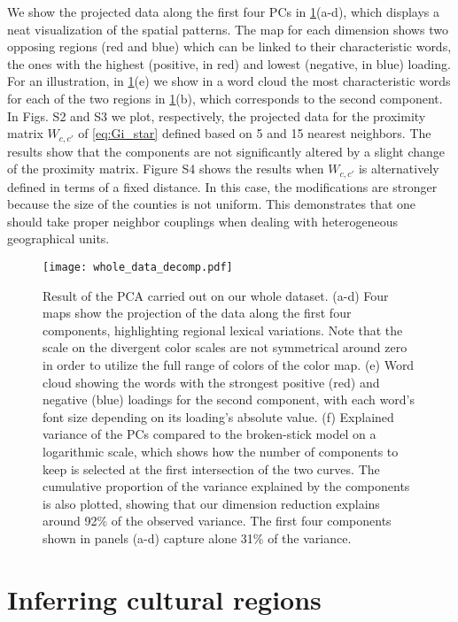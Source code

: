 \documentclass[../thesis.tex]{subfiles}
\begin{document}
We show the projected data along the first four \acp{PC} in
\cref{fig:whole_data_decomp}(a-d), which displays a neat visualization of the spatial
patterns. The map for each dimension shows two opposing regions (red and blue) which can
be linked to their characteristic words, the ones with the highest (positive, in red)
and lowest (negative, in blue) loading. For an illustration, in
\cref{fig:whole_data_decomp}(e) we show in a word cloud the most characteristic words
for each of the two regions in \cref{fig:whole_data_decomp}(b), which corresponds to the
second component. In Figs. S2 and S3 we plot, respectively, the projected data for the
proximity matrix $W_{c, c'}$ of \cref{eq:Gi_star} defined based on 5 and 15 nearest
neighbors. The results show that the components are not significantly altered by a
slight change of the proximity matrix. Figure S4 shows the results when $W_{c, c'}$ is
alternatively defined in terms of a fixed distance. In this case, the modifications are
stronger because the size of the counties is not uniform. This demonstrates that one
should take proper neighbor couplings when dealing with heterogeneous geographical
units.

\begin{figure}[ht!]
\centering
  \texttt{[image: whole\_data\_decomp.pdf]}
  \caption{Result of the \ac{PCA} carried out on our whole dataset. (a-d) Four maps show
  the projection of the data along the first four components, highlighting regional
  lexical variations. Note that the scale on the divergent color scales are not
  symmetrical around zero in order to utilize the full range of colors of the color map.
  (e) Word cloud showing the words with the strongest positive (red) and negative (blue)
  loadings for the second component, with each word's font size depending on its
  loading's absolute value. (f) Explained variance of the \acp{PC} compared to the
  broken-stick model on a logarithmic scale, which shows how the number of components to
  keep is selected at the first intersection of the two curves. The cumulative
  proportion of the variance explained by the components is also plotted, showing that
  our dimension reduction explains around 92\% of the observed variance. The first four
  components shown in panels (a-d) capture alone 31\% of the variance.}
  \label{fig:whole_data_decomp}
\end{figure}


\section{Inferring cultural regions}
\end{document}

